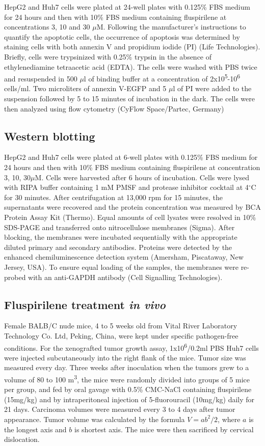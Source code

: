 \documentclass[10pt,letterpaper]{article}
\begin{document}
HepG2 and Huh7 cells were plated at 24-well plates with 0.125\% FBS medium for 24 hours and then with 10\% FBS medium containing fluspirilene at concentrations 3, 10 and 30 $\mu$M. Following the manufacturer's instructions to quantify the apoptotic cells, the occurrence of apoptosis was determined by staining cells with both annexin V and propidium iodide (PI) (Life Technologies). Briefly, cells were trypsinized with 0.25\% trypsin in the absence of ethylenediamine tetraacetic acid (EDTA). The cells were washed with PBS twice and resuspended in 500 $\mu$l of binding buffer at a concentration of 2x10\textsuperscript{5}-10\textsuperscript{6} cells/ml. Two microliters of annexin V-EGFP and 5 $\mu$l of PI were added to the suspension followed by 5 to 15 minutes of incubation in the dark. The cells were then analyzed using flow cytometry (CyFlow Space/Partec, Germany)

\subsection*{Western blotting}

HepG2 and Huh7 cells were plated at 6-well plates with 0.125\% FBS medium for 24 hours and then with 10\% FBS medium containing fluspirilene at concentration 3, 10, 30$\mu$M. Cells were harvested after 6 hours of incubation. Cells were lysed with RIPA buffer containing 1 mM PMSF and protease inhibitor cocktail at 4$^\circ$C for 30 minutes. After centrifugation at 13,000 rpm for 15 minutes, the supernatants were recovered and the protein concentration was measured by BCA Protein Assay Kit (Thermo). Equal amounts of cell lysates were resolved in 10\% SDS-PAGE and transferred onto nitrocellulose membranes (Sigma). After blocking, the membranes were incubated sequentially with the appropriate diluted primary and secondary antibodies. Proteins were detected by the enhanced chemiluminescence detection system (Amersham, Piscataway, New Jersey, USA). To ensure equal loading of the samples, the membranes were re-probed with an anti-GAPDH antibody (Cell Signalling Technologies).

\subsection*{Fluspirilene treatment \textit{in vivo}}

Female BALB/C nude mice, 4 to 5 weeks old from Vital River Laboratory Technology Co. Ltd, Peking, China, were kept under specific pathogen-free conditions. For the xenografted tumor growth assay, 1x10\textsuperscript{6}/0.2ml PBS Huh7 cells were injected subcutaneously into the right flank of the mice. Tumor size was measured every day. Three weeks after inoculation when the tumors grew to a volume of 80 to 100 m\textsuperscript{3}, the mice were randomly divided into groups of 5 mice per group, and fed by oral gavage with 0.5\% CMC-NaCl containing fluspirilene (15mg/kg) and by intraperitoneal injection of 5-fluorouracil (10mg/kg) daily for 21 days. Carcinoma volumes were measured every 3 to 4 days after tumor appearance. Tumor volume was calculated by the formula $V=ab^2/2$, where $a$ is the longest axis and $b$ is shortest axis. The mice were then sacrificed by cervical dislocation.
\end{document}
